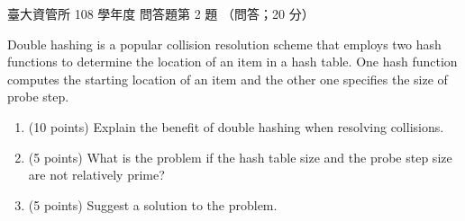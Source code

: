 \begin{pastexam}[label={px:ntu-108-im-it-02}]{臺大資管所 108 學年度 問答題第 2 題}
（問答；20 分）

Double hashing is a popular collision resolution scheme that employs two hash functions to
determine the location of an item in a hash table. One hash function computes the starting
location of an item and the other one specifies the size of probe step.
\begin{enumerate}[label=(\alph*)]
\item (10 points) Explain the benefit of double hashing when resolving collisions.
\item (5 points) What is the problem if the hash table size and the probe step size are not
relatively prime?
\item (5 points) Suggest a solution to the problem.
\end{enumerate}
\end{pastexam}

